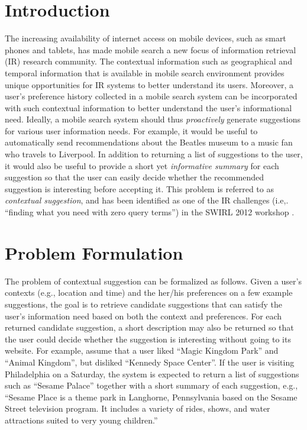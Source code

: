 \section{Introduction}

The increasing availability of internet access on
mobile devices, such as smart phones and tablets,
has made mobile search a new focus of information retrieval (IR) research community.
The contextual information such as geographical and temporal 
information that is available in mobile search environment provides 
unique opportunities for IR systems 
to better understand its users. Moreover, a user's preference history 
collected in a mobile search system can be incorporated with such 
contextual information to better understand the user's informational need. 
Ideally, a mobile search system should thus {\em proactively} generate 
suggestions for various user information needs.  
For example, it would be useful to automatically send recommendations about 
the Beatles museum to a music fan who travels to Liverpool. In addition to 
returning a list of suggestions to the user, it would also be useful 
to provide a short yet \textit{informative summary} for each suggestion so that 
the user can easily decide whether the recommended suggestion is interesting 
before accepting it. This problem is referred to as {\em contextual suggestion}, 
and has been identified as one of the IR challenges (i.e,. ``finding what you 
need with zero query terms'') in the SWIRL 2012 workshop \cite{allan:2012}.


\section{Problem Formulation} 
\label{sec:chap5prob}

The problem of contextual suggestion can be formalized 
as follows. Given a user's contexts (e.g., location
and time) and the her/his preferences on a few example
suggestions, the goal is to retrieve candidate 
suggestions that can satisfy the user's information 
need based on both the context and preferences. 
For each returned candidate suggestion, a short description 
may also be returned so that the user could decide whether 
the suggestion is interesting without going to its website.
For example, assume that a user liked ``Magic Kingdom Park'' 
and ``Animal Kingdom'', but disliked ``Kennedy Space Center''. 
If the user is visiting Philadelphia on a Saturday, the system 
is expected to return a list of suggestions such as ``Sesame Palace'' 
together with a short summary of each suggestion, 
e.g., ``Sesame Place is a theme park in Langhorne, Pennsylvania based on 
the Sesame Street television program. It includes a variety of rides, shows, 
and water attractions suited to very young children.''

